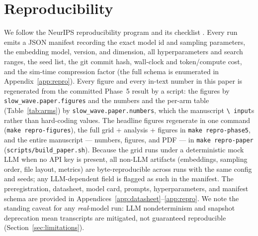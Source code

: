 \section{Reproducibility}\label{sec:repro}

We follow the NeurIPS reproducibility program and its checklist
\citep{pineau2021reproducibility}. Every run emits a JSON manifest recording the
exact model id and sampling parameters, the embedding model, version, and
dimension, all hyperparameters and search ranges, the seed list, the git commit
hash, wall-clock and token/compute cost, and the sim-time compression factor
(the full schema is enumerated in Appendix~\ref{app:repro}). Every figure and
every in-text number in this paper is regenerated from the committed Phase~5
result by a script: the figures by \texttt{slow\_wave.paper.figures} and the
numbers and the per-arm table (Table~\ref{tab:arms}) by
\texttt{slow\_wave.paper.numbers}, which the manuscript \texttt{\textbackslash
input}s rather than hard-coding values. The headline figures regenerate in one
command (\texttt{make repro-figures}), the full grid + analysis + figures in
\texttt{make repro-phase5}, and the entire manuscript --- numbers, figures, and
PDF --- in \texttt{make repro-paper} (\texttt{scripts/build\_paper.sh}). Because
the grid runs under a deterministic mock LLM when no API key is present, all
non-LLM artifacts (embeddings, sampling order, file layout, metrics) are
byte-reproducible across runs with the same config and seeds; any
LLM-dependent field is flagged as such in the manifest. The preregistration,
datasheet, model card, prompts, hyperparameters, and manifest schema are
provided in Appendices~\ref{app:datasheet}--\ref{app:repro}. We note the
standing caveat for any \emph{real}-model run: LLM nondeterminism and snapshot
deprecation mean transcripts are mitigated, not guaranteed reproducible
(Section~\ref{sec:limitations}).
